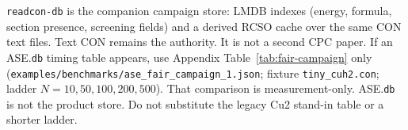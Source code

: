 \texttt{readcon-db} is the companion campaign store: LMDB indexes
(energy, formula, section presence, screening fields) and a derived
RCSO cache over the same CON text files. Text CON remains the
authority. It is not a second CPC paper.
If an ASE.\texttt{db} timing table appears, use Appendix
Table~\ref{tab:fair-campaign} only
(\texttt{examples/benchmarks/ase\_fair\_campaign\_1.json}; fixture
\texttt{tiny\_cuh2.con}; ladder $N=10,50,100,200,500$).
That comparison is measurement-only. ASE.\texttt{db} is not the
product store. Do not substitute the legacy Cu2 stand-in table or a
shorter ladder.
